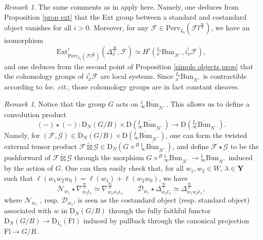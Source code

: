 \documentclass[11pt]{amsart}
\theoremstyle{plain}
\theoremstyle{remark}
\newtheorem{rem}[thm]{Remark}
\numberwithin{equation}{section}
\begin{document}
 \begin{rem}\label{rem construct}
     The same comments as in \cite[Remark 4.4.7]{ABBGM} apply here. Namely, one deduces from Proposition \ref{prop ext} that the Ext group between a standard and costandard object vanishes for all $i>0$. Moreover, for any $\mathcal{F}\in \mathrm{Perv}_{I_\mathrm{u}}(\mathcal{F}l^{\frac{\infty}{2}})$, we have an isomorphism
     $$\mathrm{Ext}^i_{\mathrm{Perv}_{I_{\mathrm{u}}}(\mathcal{F}l^{\frac{\infty}{2}})}(\Delta_x^{\frac{\infty}{2}},\mathcal{F})\simeq H^i({^{I_\mathrm{u}}_x\mathrm{Bun}}_{N^-},i_x^!\mathcal{F}),$$
     and one deduces from the second point of Proposition \ref{simple objects prop} that the cohomology groups of $i_x^!\mathcal{F}$ are local systems. Since ${^{I_\mathrm{u}}_x\mathrm{Bun}}_{N^-}$ is contractible according to \textit{loc. cit.}, those cohomology groups are in fact constant sheaves. 
 \end{rem}
	\begin{rem}\label{rem conv flag}   
		Notice that the group $G$ acts on ${^1_\infty\overline{\mathrm{Bun}}}_{N^-}$. This allows us to define a convolution product 
		$$(-)\star(-):\mathrm{D}_{N}(G/B)\times\mathrm{D}({^{I}_\infty\overline{\mathrm{Bun}}}_{N^-})\to \mathrm{D}({^{I_{\mathrm{u}}}_\infty\overline{\mathrm{Bun}}}_{N^-}). $$
		Namely, for $(\mathcal{F},\mathcal{G})\in \mathrm{D}_{N}(G/B)\times\mathrm{D}({^{I}_\infty\overline{\mathrm{Bun}}}_{N^-})$, one can form the twisted external tensor product $\mathcal{F}\widetilde{\boxtimes}\mathcal{G}\in\mathrm{D}_{N}(G\times^{B}{^{1}_\infty\overline{\mathrm{Bun}}}_{N^-})$, and define $\mathcal{F}\star\mathcal{G}$ to be the pushforward of $\mathcal{F}\widetilde{\boxtimes}\mathcal{G}$ through the morphism $G\times^{B}{^{1}_\infty\overline{\mathrm{Bun}}}_{N^-}\to {^{1}_\infty\overline{\mathrm{Bun}}}_{N^-}$ induced by the action of $G$. One can then easily check that, for all $w_1,w_2\in W$, $\lambda\in\mathbf{Y}$ such that $\ell(w_1w_2w_0)=\ell(w_1)+\ell(w_2w_0)$, we have 
		\begin{equation}\label{add length}
			\mathcal{N}_{w_1}\star\nabla_{w_2t_\lambda}^{\frac{\infty}{2}}\simeq \nabla_{w_1w_2t_\lambda}^{\frac{\infty}{2}}\qquad  \mathcal{D}_{w_1}\star\Delta_{w_2t_\lambda}^{\frac{\infty}{2}}\simeq \Delta_{w_1w_2t_\lambda}^{\frac{\infty}{2}},
		\end{equation}
  where $\mathcal{N}_{w_1}$ , resp. $\mathcal{D}_{w_1}$, is seen as the costandard object (resp. standard object) associated with $w$ in $\mathrm{D}_N(G/B)$ through the fully faithful functor $\mathrm{D}_N(G/B)\to \mathrm{D}_{I_\mathrm{u}}(\mathrm{Fl})$ induced by pullback through the canonical projection $\mathrm{Fl}\to G/B$.
	\end{rem}
\end{document}
